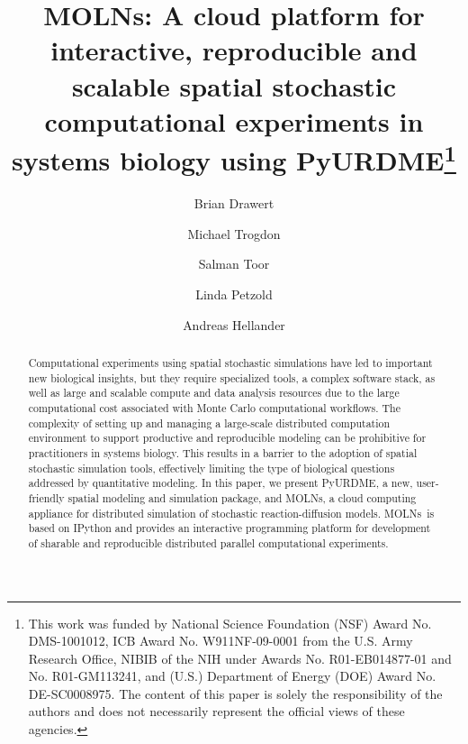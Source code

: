 \documentclass[final,leqno,onefignum,onetabnum]{siamltex1213}
\def\packagename {MOLNs}
\begin{document}
\title{MOLNs: A cloud platform for interactive, reproducible and scalable spatial stochastic computational experiments in systems biology using PyURDME\thanks{This work was funded by National Science Foundation (NSF) Award No. DMS-1001012, ICB Award No. W911NF-09-0001 from the U.S. Army Research Office, NIBIB of the NIH under Awards No. R01-EB014877-01 and No. R01-GM113241, and (U.S.) Department of Energy (DOE) Award No. DE-SC0008975. The content of this paper is solely the responsibility of the authors and does not necessarily represent the official views of these agencies.
}}


\author{Brian Drawert
\and Michael Trogdon
\and Salman Toor
\and Linda Petzold
\and Andreas Hellander
}
\maketitle
{}



\begin{abstract}
Computational experiments using spatial stochastic simulations have led to important new biological insights, but they require specialized tools, a complex software stack, as well as large and scalable compute and data analysis resources due to the large computational cost associated with Monte Carlo computational workflows. The complexity of setting up and managing a large-scale distributed computation environment to support productive and reproducible modeling can be prohibitive for practitioners in systems biology. This results in a barrier to the adoption of spatial stochastic simulation tools, effectively limiting the type of biological questions addressed by quantitative modeling. 
In this paper, we present PyURDME, a new, user-friendly spatial modeling and simulation package, and \packagename, a cloud computing appliance for distributed simulation of stochastic reaction-diffusion models.
\packagename~is based on IPython and provides an interactive programming platform for development of sharable and reproducible distributed parallel computational experiments. 
\end{abstract}
\end{document}
